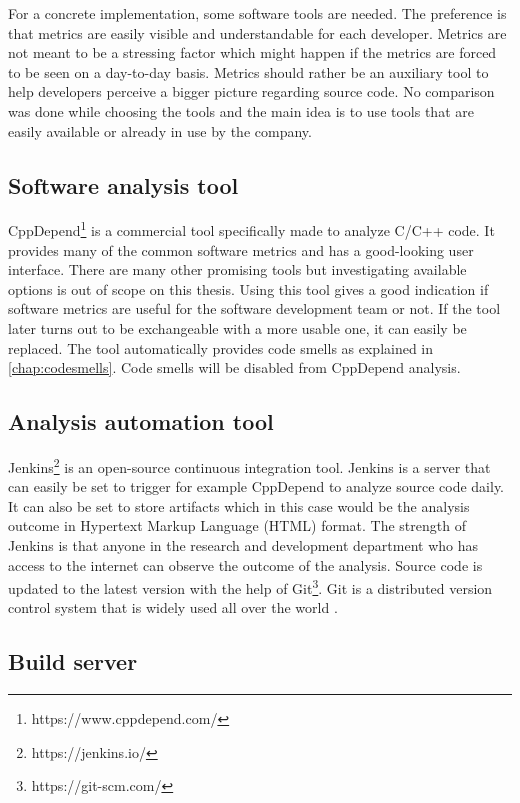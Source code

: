 For a concrete implementation, some software tools are needed. The preference is that metrics are easily visible and understandable for each developer. Metrics are not meant to be a stressing factor which might happen if the metrics are forced to be seen on a day-to-day basis. Metrics should rather be an auxiliary tool to help developers perceive a bigger picture regarding source code. No comparison was done while choosing the tools and the main idea is to use tools that are easily available or already in use by the company.

\subsection{Software analysis tool}
\label{chap:sofanatool}

CppDepend\footnote{https://www.cppdepend.com/} is a commercial tool specifically made to analyze C/C++ code. It provides many of the common software metrics and has a good-looking user interface. There are many other promising tools but investigating available options is out of scope on this thesis. Using this tool gives a good indication if software metrics are useful for the software development team or not. If the tool later turns out to be exchangeable with a more usable one, it can easily be replaced. The tool automatically provides code smells as explained in \autoref{chap:codesmells}. Code smells will be disabled from CppDepend analysis.

\subsection{Analysis automation tool}

Jenkins\footnote{https://jenkins.io/} is an open-source continuous integration tool. Jenkins is a server that can easily be set to trigger for example CppDepend to analyze source code daily. It can also be set to store artifacts which in this case would be the analysis outcome in Hypertext Markup Language (HTML) format.  The strength of Jenkins is that anyone in the research and development department who has access to the internet can observe the outcome of the analysis. Source code is updated to the latest version with the help of Git\footnote{https://git-scm.com/}. Git is a distributed version control system that is widely used all over the world \cite{gitsurvey}.

\subsection{Build server}

